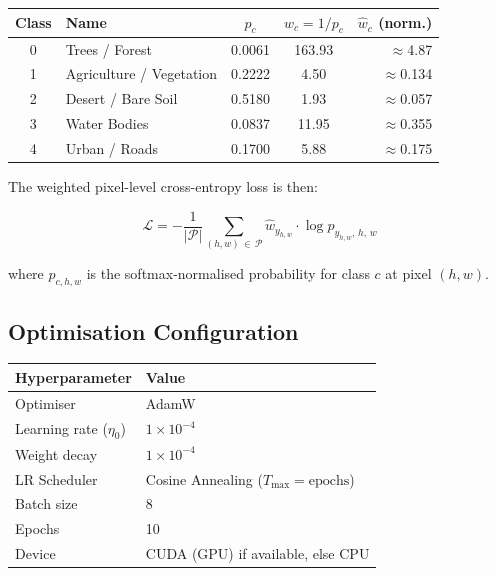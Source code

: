 \documentclass[12pt, a4paper]{article}
\begin{document}
\begin{center}
\renewcommand{\arraystretch}{1.25}
\begin{tabular}{clccr}
\toprule
\textbf{Class} & \textbf{Name} & $p_c$ & $w_c = 1/p_c$ & $\hat{w}_c$ (norm.) \\
\midrule
\rowcolor{green!6}
0 & Trees / Forest           & 0.0061 & 163.93 & $\approx$4.87 \\
\rowcolor{lime!6}
1 & Agriculture / Vegetation & 0.2222 & 4.50   & $\approx$0.134 \\
\rowcolor{orange!6}
2 & Desert / Bare Soil       & 0.5180 & 1.93   & $\approx$0.057 \\
\rowcolor{blue!6}
3 & Water Bodies             & 0.0837 & 11.95  & $\approx$0.355 \\
\rowcolor{gray!8}
4 & Urban / Roads            & 0.1700 & 5.88   & $\approx$0.175 \\
\bottomrule
\end{tabular}
\end{center}

The weighted pixel-level cross-entropy loss is then:

\begin{equation}
  \mathcal{L} = -\frac{1}{|\mathcal{P}|}
    \sum_{(h,w)\,\in\,\mathcal{P}}
    \hat{w}_{y_{h,w}} \cdot \log \hat{p}_{y_{h,w},\,h,\,w}
\end{equation}

where $\hat{p}_{c,h,w}$ is the softmax-normalised probability for class $c$ at pixel $(h,w)$.

\subsection{Optimisation Configuration}

\begin{center}
\renewcommand{\arraystretch}{1.25}
\begin{tabular}{ll}
\toprule
\textbf{Hyperparameter} & \textbf{Value} \\
\midrule
Optimiser           & AdamW \\
Learning rate ($\eta_0$) & $1 \times 10^{-4}$ \\
Weight decay        & $1 \times 10^{-4}$ \\
LR Scheduler        & Cosine Annealing ($T_{\max} = \text{epochs}$) \\
Batch size          & 8 \\
Epochs              & 10 \\
Device              & CUDA (GPU) if available, else CPU \\
\bottomrule
\end{tabular}
\end{center}
\end{document}
